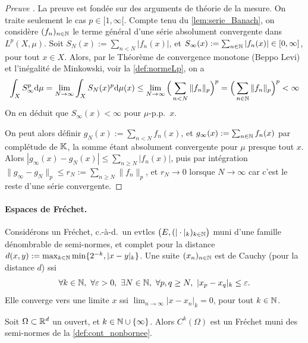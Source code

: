 \begin{proof}[Preuve \facultatif]
	La preuve est fondée sur des arguments de théorie de la mesure.
	On traite seulement le cas $p\in [1,\infty[$. 
	Compte tenu du \cref{lem:serie_Banach}, on considère $(f_n)_{n \in \mathbb{N}}$ le terme général d'une série absolument convergente dans $L^p(X,\mu)$. 
	Soit $S_N(x) := \sum_{n<N} |f_n(x)|$, et $S_\infty(x) := \sum_{n\in \mathbb{N}} |f_n(x)| \in [0,\infty]$, pour tout $x \in X$.
	Alors, par le Théorème de convergence monotone (Beppo Levi) et l'inégalité de Minkowski, voir la \cref{def:normeLp}, on a  
	\begin{equation}		
		\int_X S_\infty^p \mathrm{d} \mu 
		= \lim_{N \to \infty} \int_X S_N(x)^p \mathrm{d} \mu(x)
		\leq \lim_{N \to \infty} \Big(\sum_{n < N} \|f_n\|_p \Big)^p
		= \Big(\sum_{n \in \mathbb{N}} \|f_n\|_p \Big)^p < \infty
	\end{equation}
	On en déduit que $S_\infty(x) < \infty$ pour $\mu$-p.p.\ $x$. 

	On peut alors définir $g_N(x) := \sum_{n <N} f_n(x)$, et $g_\infty(x) := \sum_{n \in \mathbb{N}} f_n(x)$ par complétude de $\mathbb{K}$, la somme étant absolument convergente pour $\mu$ presque tout $x$.
	Alors $|g_\infty(x)-g_N(x)| \leq\sum_{n\geq N} |f_n(x)|$, puis par intégration $\|g_\infty-g_N\|_p \leq  r_N := \sum_{n\geq N} \|f_n\|_p$, et $r_N \to 0$ lorsque $N \to \infty$ car c'est le reste d'une série convergente. 
	
\end{proof}


\paragraph{Espaces de Fréchet.}

\begin{remark}
	Considérons un Fréchet, c.-à-d.\ un evtlcs $\big(E,(|\cdot|_k)_{k \in \mathbb{N}}\big)$ muni d'une famille dénombrable de semi-normes, et complet pour la distance $d(x,y) := \max_{k \in \mathbb{N}} \min\{2^{-k}, |x-y|_k\}$. Une suite $(x_n)_{n \in \mathbb{N}}$ est de Cauchy (pour la distance $d$) ssi 
	\begin{equation*}
		\forall k \in \bN,\ \forall\ve>0,\ \exists N \in \bN,\ \forall p,q\geq N,\ |x_p-x_q|_k \leq \ve.
	\end{equation*}
	Elle converge vers une limite $x$ ssi $\lim_{n \to \infty} |x-x_n|_k = 0$, pour tout $k \in \mathbb{N}$. 
\end{remark}


\begin{exemple}
\label{ex:testDistribFrechet}
	Soit $\Omega \subset \mathbb{R}^d$ un ouvert, et $k \in \mathbb{N} \cup \{\infty\}$. Alors $C^k(\Omega)$ est un Fréchet muni des semi-normes de la \cref{def:cont_nonbornee}. 
\end{exemple}

